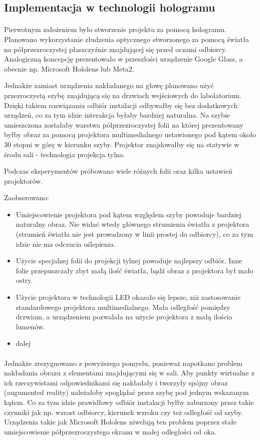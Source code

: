 \subsection{Implementacja w technologii hologramu}
\paragraph{}
Pierwotnym założeniem było stworzenie projektu za pomocą hologramu. Planowano wykorzystanie złudzenia optycznego stworzonego za pomocą światła na półprzezroczystej płaszczyźnie znajdującej się przed oczami odbiorcy. Analogiczną koncepcję prezentowało w przeszłości urządzenie Google Glass, a obecnie np. Microsoft Hololens lub Meta2.

Jednakże zamiast urządzenia nakładanego na głowę planowano użyć przezroczystą szybę znajdującą się na drzwiach wejściowych do labolatorium. Dzięki takiem rozwiązaniu odbiór instalacji odbywałby się bez dodatkowych urządzeń, co za tym idzie interakcja byłaby bardziej naturalna.
Na szybie umieszczona zostałaby warstwa półprzezroczystej folii na której prezentowany byłby obraz za pomocą projektora multimedialnego ustawionego pod kątem około 30 stopni w górę w kierunku szyby. Projektor znajdowałby się na statywie w środu sali - technologia projekcja tylna.

Podczas eksperymentów próbowano wiele różnych folii oraz kilka ustawień projektorów. 

Zaobserowano:
\begin{itemize}
	\item Umiejscowienie projektora pod kątem względem szyby powoduje bardziej naturalny obraz. Nie widać wtedy głównego strumienia światła z projektora (strumień światła nie jest prowadzony w linii prostej do odbiorcy), co za tym idzie  nie ma odczucia oślepienia.
    \item Użycie specjalnej folii do projekcji tylnej powoduje najlepszy odbiór. Inne folie przepuszczały zbyt małą ilość światła, bądź obraz z projektora był mało ostry.
    \item Użycie projektora w technologii LED okazało się lepsze, niż zastosowanie standardowego projektora multimedialnego. Mała odległość pomiędzy drzwiam, a urządzeniem pozwalała na użycie projektora z małą ilościa lumenów.
 
    \item {\color{red}dalej}
\end{itemize}

\paragraph{}
Jednakże zrezygnowano z powyższego pomysłu, ponieważ napotkano problem nakładania obrazu z  elementami znajdującymi się w sali. Aby punkty wirtualne z ich rzeczywistami odpowiednikami się nakładały i tworzyły spójny obraz (augumented reality) należałoby spoglądać przez szybę pod jednym wskazanym kątem. Co za tym idzie prawidłowy odbiór instalacji byłby zaburzony przez takie czynniki jak np. wzrost odbiorcy, kierunek wzroku czy też odległość od szyby. Urządzenia takie jak Microsoft Hololens niwelują ten problem poprzez stałe umiejscowienie półprzezroczystego ekranu w małej odległości od oka. 

